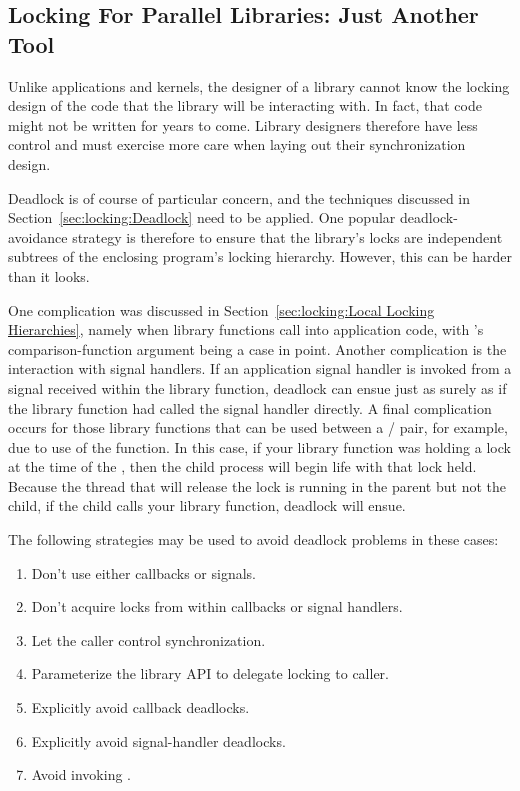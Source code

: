\subsection{Locking For Parallel Libraries: Just Another Tool}
\label{sec:locking:Locking For Parallel Libraries: Just Another Tool}

Unlike applications and kernels, the designer of a library cannot
know the locking design of the code that the library will be interacting
with.
In fact, that code might not be written for years to come.
Library designers therefore have less control and must exercise more
care when laying out their synchronization design.

Deadlock is of course of particular concern, and the techniques discussed
in Section~\ref{sec:locking:Deadlock} need to be applied.
One popular deadlock-avoidance strategy is therefore to ensure that
the library's locks are independent subtrees of the enclosing program's
locking hierarchy.
However, this can be harder than it looks.

One complication was discussed in
Section~\ref{sec:locking:Local Locking Hierarchies}, namely
when library functions call into application code, with 's
comparison-function argument being a case in point.
Another complication is the interaction with signal handlers.
If an application signal handler is invoked from a signal received within
the library function, deadlock can ensue just as surely as
if the library function had called the signal handler directly.
A final complication occurs for those library functions that can be used
between a / pair, for example, due to use of
the  function.
In this case, if your library function was holding a lock at the time of
the , then the child process will begin life with that lock held.
Because the thread that will release the lock is running in the parent
but not the child, if the child calls your library function, deadlock
will ensue.

The following strategies may be used to avoid deadlock problems in these cases:

\begin{enumerate}
\item	Don't use either callbacks or signals.
\item	Don't acquire locks from within callbacks or signal handlers.
\item	Let the caller control synchronization.
\item	Parameterize the library API to delegate locking to caller.
\item	Explicitly avoid callback deadlocks.
\item	Explicitly avoid signal-handler deadlocks.
\item	Avoid invoking .
\end{enumerate}

